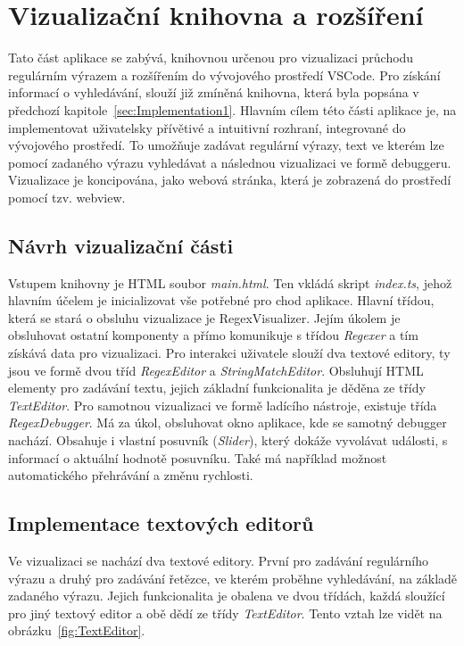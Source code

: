 \chapter{Vizualizační knihovna a rozšíření}\label{sec:Implementation2}

Tato část aplikace se zabývá, knihovnou určenou pro vizualizaci průchodu regulárním výrazem a rozšířením do vývojového prostředí VSCode.
Pro získání informací o vyhledávání, slouží již zmíněná knihovna, která byla popsána v předchozí kapitole~\ref{sec:Implementation1}.
Hlavním cílem této části aplikace je, na implementovat uživatelsky přívětivé a intuitivní rozhraní, integrované do vývojového prostředí.
To umožňuje zadávat regulární výrazy, text ve kterém lze pomocí zadaného výrazu vyhledávat a následnou vizualizaci ve formě debuggeru.
Vizualizace je koncipována, jako webová stránka, která je zobrazená do prostředí pomocí tzv. webview.

\section{Návrh vizualizační části}

Vstupem knihovny je HTML soubor \textit{main.html}.
Ten vkládá skript \textit{index.ts}, jehož hlavním účelem je inicializovat vše potřebné pro chod aplikace.
Hlavní třídou, která se stará o obsluhu vizualizace je RegexVisualizer. 
Jejím úkolem je obsluhovat ostatní komponenty a přímo komunikuje s třídou \textit{Regexer} a tím získává data pro vizualizaci.
Pro interakci uživatele slouží dva textové editory, ty jsou ve formě dvou tříd \textit{RegexEditor} a \textit{StringMatchEditor}.
Obsluhují HTML elementy pro zadávání textu, jejich základní funkcionalita je děděna ze třídy \textit{TextEditor}.
Pro samotnou vizualizaci ve formě ladícího nástroje, existuje třída \textit{RegexDebugger}.
Má za úkol, obsluhovat okno aplikace, kde se samotný debugger nachází.
Obsahuje i vlastní posuvník (\textit{Slider}), který dokáže vyvolávat události, s informací o aktuální hodnotě posuvníku.
Také má například možnost automatického přehrávání a změnu rychlosti.


\section{Implementace textových editorů}

Ve vizualizaci se nachází dva textové editory.
První pro zadávání regulárního výrazu a druhý pro zadávání řetězce, ve kterém proběhne vyhledávání, na základě zadaného výrazu.
Jejich funkcionalita je obalena ve dvou třídách, každá sloužící pro jiný textový editor a obě dědí ze třídy \textit{TextEditor}.
Tento vztah lze vidět na obrázku~\ref{fig:TextEditor}.

